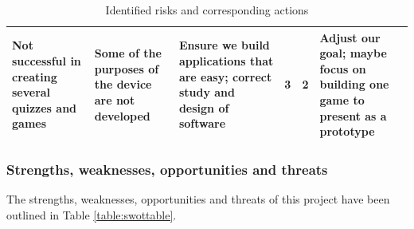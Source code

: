 \documentclass{article}
\begin{document}
\begin{table}[h]
\begin{center}
\begin{small}
\begin{tabular}{|p{3cm}|p{3cm}|p{3cm}|p{1cm}|p{1.2cm}|p{3cm}|}
Not successful in creating several quizzes and games                                              & Some of the purposes of the device are not developed                                                            & Ensure we build applications that are easy; correct study and design of software                                                                                                                          & 3        & 2          & Adjust our goal; maybe focus on building one game to present as a prototype                                                                       \\ \hline
\end{tabular}
\end{small}
\end{center}
\caption{Identified risks and corresponding actions}
\label{table:riskstable}
\end{table}

\subsubsection{Strengths, weaknesses, opportunities and threats}

The strengths, weaknesses, opportunities and threats of this project have been outlined in Table \ref{table:swottable}.
\end{document}
